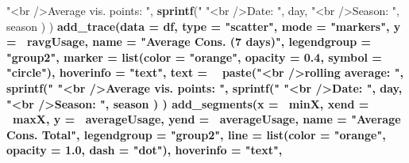 \documentclass[
]{book}
\newenvironment{Shaded}{\begin{snugshade}}{\end{snugshade}}
\newcommand{\DataTypeTok}[1]{\textcolor[rgb]{0.13,0.29,0.53}{#1}}
\newcommand{\FloatTok}[1]{\textcolor[rgb]{0.00,0.00,0.81}{#1}}
\newcommand{\KeywordTok}[1]{\textcolor[rgb]{0.13,0.29,0.53}{\textbf{#1}}}
\newcommand{\NormalTok}[1]{#1}
\newcommand{\OperatorTok}[1]{\textcolor[rgb]{0.81,0.36,0.00}{\textbf{#1}}}
\newcommand{\StringTok}[1]{\textcolor[rgb]{0.31,0.60,0.02}{#1}}
\let\oldShaded\Shaded
\let\endoldShaded\endShaded
\renewenvironment{Shaded}{\footnotesize\oldShaded}{\endoldShaded}
\begin{document}
\begin{Shaded}
\begin{Highlighting}[]
{{{{{{{{{{{{{{{{{{{{{{{{{{{{{{{{{{{{{{{                           \StringTok{"<br />Average vis. points: "}\NormalTok{, }\KeywordTok{sprintf}\NormalTok{(}\StringTok{"%
                           \StringTok{"<br />Date:                        "}\NormalTok{, day,}
                           \StringTok{"<br />Season:                   "}\NormalTok{, season}
\NormalTok{            )}
\NormalTok{  ) }\OperatorTok{%
\StringTok{  }\KeywordTok{add_trace}\NormalTok{(}\DataTypeTok{data =}\NormalTok{ df,}
            \DataTypeTok{type =} \StringTok{"scatter"}\NormalTok{,}
            \DataTypeTok{mode =} \StringTok{"markers"}\NormalTok{,}
            \DataTypeTok{y =} \OperatorTok{~}\NormalTok{ravgUsage,}
            \DataTypeTok{name =} \StringTok{"Average Cons. (7 days)"}\NormalTok{,}
            \DataTypeTok{legendgroup =} \StringTok{"group2"}\NormalTok{,}
            \DataTypeTok{marker =} \KeywordTok{list}\NormalTok{(}\DataTypeTok{color =} \StringTok{"orange"}\NormalTok{, }\DataTypeTok{opacity =} \FloatTok{0.4}\NormalTok{, }\DataTypeTok{symbol =} \StringTok{"circle"}\NormalTok{),}
            \DataTypeTok{hoverinfo =} \StringTok{"text"}\NormalTok{,}
            \DataTypeTok{text =} \OperatorTok{~}\StringTok{ }\KeywordTok{paste}\NormalTok{(}\StringTok{"<br />rolling average:        "}\NormalTok{, }\KeywordTok{sprintf}\NormalTok{(}\StringTok{"%
                           \StringTok{"<br />Average vis. points: "}\NormalTok{, }\KeywordTok{sprintf}\NormalTok{(}\StringTok{"%
                           \StringTok{"<br />Date:                        "}\NormalTok{, day,}
                           \StringTok{"<br />Season:                   "}\NormalTok{, season}
\NormalTok{            )}
\NormalTok{  ) }\OperatorTok{%
\StringTok{  }\KeywordTok{add_segments}\NormalTok{(}\DataTypeTok{x =} \OperatorTok{~}\NormalTok{minX,}
               \DataTypeTok{xend =} \OperatorTok{~}\NormalTok{maxX,}
               \DataTypeTok{y =} \OperatorTok{~}\NormalTok{averageUsage,}
               \DataTypeTok{yend =} \OperatorTok{~}\NormalTok{averageUsage,}
               \DataTypeTok{name =} \StringTok{"Average Cons. Total"}\NormalTok{,}
               \DataTypeTok{legendgroup =} \StringTok{"group2"}\NormalTok{,}
               \DataTypeTok{line =} \KeywordTok{list}\NormalTok{(}\DataTypeTok{color =} \StringTok{"orange"}\NormalTok{, }\DataTypeTok{opacity =} \FloatTok{1.0}\NormalTok{, }\DataTypeTok{dash =} \StringTok{"dot"}\NormalTok{),}
               \DataTypeTok{hoverinfo =} \StringTok{"text"}\NormalTok{,}
}}}}}}}}}}}}}}}}}}}}}}}}}}}}}}}}}}}}}}}}}}}}
\end{Highlighting}
\end{Shaded}
\end{document}
